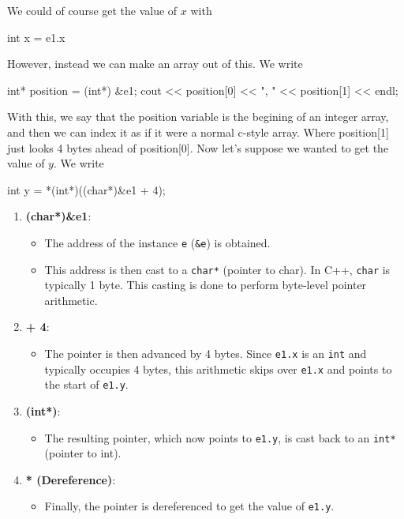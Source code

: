 \documentclass{report}
\begin{document}
    \pagebreak \bigbreak \noindent 
    We could of course get the value of $x$ with 
    \bigbreak \noindent 
    \begin{cppcode}
    int x = e1.x
    \end{cppcode}
    \bigbreak \noindent 
    However, instead we can make an array out of this. We write 
    \bigbreak \noindent 
    \begin{cppcode}
        int* position = (int*) &e1;
        cout << position[0] << ", " << position[1] << endl;
    \end{cppcode}
    \bigbreak \noindent 
    With this, we say that the position variable is the begining of an integer array, and then we can index it as if it were a normal c-style array. Where position[1] just looks 4 bytes ahead of position[0].
    \bigbreak \noindent 
    Now let's suppose we wanted to get the value of $y$. We write 
    \bigbreak \noindent 
    \begin{cppcode}
        int y = *(int*)((char*)&e1 + 4);
    \end{cppcode}
    \bigbreak \noindent 
    \begin{enumerate}
        \item \textbf{(char*)&e1}: 
            \begin{itemize}
                \item The address of the instance \texttt{e} (\texttt{\&e}) is obtained.
                \item This address is then cast to a \texttt{char*} (pointer to char). In C++, \texttt{char} is typically 1 byte. This casting is done to perform byte-level pointer arithmetic.
            \end{itemize}

        \item \textbf{+ 4}:
            \begin{itemize}
                \item The pointer is then advanced by 4 bytes. Since \texttt{e1.x} is an \texttt{int} and typically occupies 4 bytes, this arithmetic skips over \texttt{e1.x} and points to the start of \texttt{e1.y}.
            \end{itemize}

        \item \textbf{(int*)}:
            \begin{itemize}
                \item The resulting pointer, which now points to \texttt{e1.y}, is cast back to an \texttt{int*} (pointer to int).
            \end{itemize}

        \item \textbf{* (Dereference)}:
            \begin{itemize}
                \item Finally, the pointer is dereferenced to get the value of \texttt{e1.y}.
            \end{itemize}
    \end{enumerate}
    \bigbreak \noindent 
\end{document}
